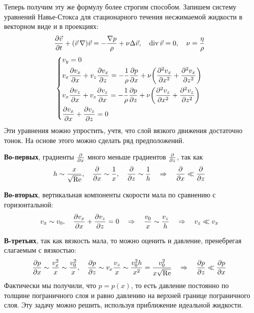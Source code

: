 Теперь получим эту же формулу более строгим способом. 
Запишем систему уравнений Навье-Стокса для стационарного течения 
несжимаемой жидкости в векторном виде и в проекциях:
\begin{equation}
    \pdv{\vec{v}}{t}+ (\vec{v}\,\nabla)\vec{v} = 
        -\frac{\nabla p}{\rho} + \nu \Delta \vec{v}, \quad
        \operatorname{div} \vec{v} = 0, \quad \nu = \frac{\eta}{\rho}
\end{equation}
\begin{equation}
	\label{eq:sys}
    \left\{\begin{aligned}
        &v_y=0\\
        &v_x \pdv{v_x}{x} + v_z \pdv{v_x}{z} = 
            -\frac{1}{\rho} \pdv{p}{x} + 
            \nu\qty(\pdv[2]{v_x}{x}+\pdv[2]{v_x}{z})\\
        &v_x\pdv{v_z}{x}+v_z\pdv{v_z}{x}=
            -\frac{1}{\rho}\pdv{p}{z}+
            \nu\qty(\pdv[2]{v_z}{x}+\pdv[2]{v_z}{z})\\
        &\pdv{v_x}{x}+\pdv{v_z}{z}=0
	\end{aligned}\right.
\end{equation}
Эти уравнения можно упростить, учтя, что слой вязкого движения 
достаточно тонок. На основе этого можно сделать ряд предположений.

\textbf{Во-первых},  градиенты $\pdv{x}$ много меньше градиентов
$\pdv{z}$, так как
\begin{equation}
    h\sim \frac{x}{\sqrt{\Re}}, \quad \pdv{x}\sim \frac{1}{x},
    \quad \pdv{z} \sim \frac{1}{h} 
    \quad\Rightarrow\quad 
    \pdv{x} \ll \pdv{z}
\end{equation}

\textbf{Во-вторых}, вертикальная компоненты скорости мала по сравнению с горизонтальной:
\begin{equation}
    v_x \sim v_0, \quad \pdv{v_x}{x}+\pdv{v_z}{z}=0 
    \quad\Rightarrow\quad 
    \frac{v_0}{x}\sim \frac{v_z}{h} 
    \quad\Rightarrow\quad 
    v_z \ll v_x
\end{equation}

\textbf{В-третьих}, так как вязкость мала, то можно оценить и давление, пренебрегая слагаемым с вязкостью:
\begin{equation}
    \pdv{p}{x}\sim \frac{v_x^2}{x} \sim \frac{v_0^2}{x}, \quad
    \pdv{p}{z}\sim v_x \frac{v_z}{x} \sim \frac{v_0^2 h}{x^2}=
    \frac{v_0^2}{x \sqrt{\Re}} 
    \quad\Rightarrow\quad 
    \pdv{p}{z} \ll \pdv{p}{x}
\end{equation}
Фактически мы получили, что $p=p(x)$, то есть давление постоянно по толщине пограничного слоя и равно давлению на верхней границе пограничного слоя. Эту задачу можно решить, используя приближение идеальной жидкости.


